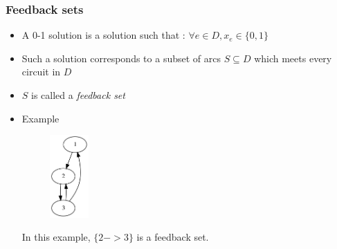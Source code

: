 \documentclass{beamer}
\begin{document}

\begin{frame}
	\frametitle{Feedback sets}
	\begin{itemize}
		\item A 0-1 solution is a solution such that : $\forall e\in D, x_e\in\{0,1\}$
		\item Such a solution corresponds to a subset of arcs $S\subseteq D$ which meets every circuit in $D$
		\item $S$ is called a \textit{feedback set}
		\item Example
		\begin{figure}
			\centering
			\includegraphics[width=1.5cm]{images/example1.png}
		\end{figure}
		In this example, $\{2->3\}$ is a feedback set.
	\end{itemize}
\end{frame}
\end{document}
